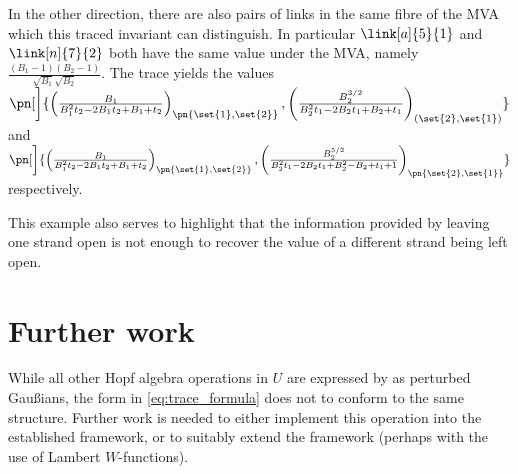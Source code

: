 In the other direction, there are also pairs of links in the same fibre of the
\ac{MVA} which this traced invariant can distinguish. In particular
$\link[a]{5}{1}$ and $\link[n]{7}{2}$ both have the same value under the
\ac{MVA}, namely
$\frac{\left(B_1-1\right) \left(B_2-1\right)}{\sqrt{B_1} \sqrt{B_2}}$.
The trace yields the values
$ \pn[\bigg]{
        \left(
                \frac{B_1}{B_1^2 t_2  -2 B_1 t_2  +B_1+t_2}
        \right)_{\pn{\set{1},\set{2}}},
        \left(
                \frac{B_2^{3/2}}{B_2^2 t_1  -2 B_2 t_1  +B_2+t_1}
        \right)_{(\set{2},\set{1})}
        }$
and
$\pn[\bigg]{
        \left(
                \frac{B_1}{B_1^2 t_2  -2 B_1 t_2  +B_1+t_2}
        \right)_{\pn{\set{1},\set{2}}},
        \left(
                \frac{B_2^{5/2}}{B_2^2 t_1  -2 B_2 t_1  +B_2^2-B_2+t_1 +1}
        \right)_{\pn{\set{2},\set{1}}}
}$
respectively.

This example also serves to highlight that the information provided by leaving
one strand open is not enough to recover the value of a different strand being
left open.

\section{Further work}
While all other Hopf algebra operations in $U$ are expressed by \cite{BV} as
perturbed Gaußians, the form in \cref{eq:trace_formula} does not to conform to
the same structure. Further work is needed to either implement this operation
into the established framework, or to suitably extend the framework (perhaps
with the use of Lambert $W$-functions).
